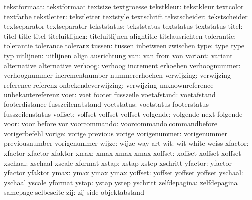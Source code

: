        tekstformaat:  tekstformaat         textsize            textgroesse
         tekstkleur:  tekstkleur           textcolor           textfarbe
        tekstletter:  tekstletter          textstyle           textschrift
      tekstscheider:  tekstscheider        textseparator       textseparator
        tekststatus:  tekststatus          textstatus          textstatus
              titel:  titel                title               titel
     titeluitlijnen:  titeluitlijnen       aligntitle          titelausrichten
         tolerantie:  tolerantie           tolerance           toleranz
             tussen:  tussen               inbetween           zwischen
               type:  type                 type                typ
          uitlijnen:  uitlijnen            align               ausrichtung
                van:  van                  from                von
            variant:  variant              alternative         alternative
            verhoog:  verhoog              increment           erhoehen
      verhoognummer:  verhoognummer        incrementnumber     nummererhoehen
         verwijzing:  verwijzing           reference           referenz
onbekendeverwijzing:  verwijzing           unknownreference    unbekantereferenz
               voet:  voet                 footer              fusszeile
        voetafstand:  voetafstand          footerdistance      fusszeilenabstand
         voetstatus:  voetstatus           footerstatus        fusszeilenstatus
            voffset:  voffset              voffset             voffset
           volgende:  volgende             next                folgende
               voor:  voor                 before              vor
       voorcommando:  voorcommando         commandbefore       vorigerbefehl
             vorige:  vorige               previous            vorige
       vorigenummer:  vorigenummer         previousnumber      vorigenummer
              wijze:  wijze                way                 art
                wit:  wit                  white               weiss
            xfactor:  xfactor              xfactor             xfaktor
               xmax:  xmax                 xmax                xmax
            xoffset:  xoffset              xoffset             xoffset
            xschaal:  xschaal              xscale              xformat
              xstap:  xstap                xstep               xschritt
            yfactor:  yfactor              yfactor             yfaktor
               ymax:  ymax                 ymax                ymax
            yoffset:  yoffset              yoffset             yoffset
            yschaal:  yschaal              yscale              yformat
              ystap:  ystap                ystep               yschritt
       zelfdepagina:  zelfdepagina         samepage            selbeseite
                zij:  zij                  side                objektabstand


